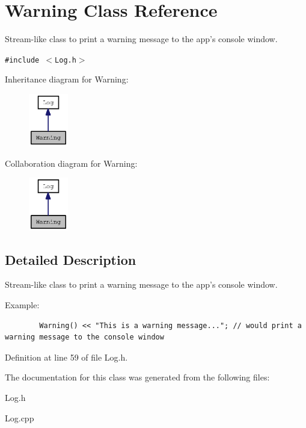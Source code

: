 \section{Warning Class Reference}
\label{classWarning}
Stream-like class to print a warning message to the app's console window.  


{\tt \#include $<$Log.h$>$}

Inheritance diagram for Warning:\nopagebreak
\begin{figure}[H]
\begin{center}
\leavevmode
\includegraphics[width=49pt]{classWarning__inherit__graph}
\end{center}
\end{figure}
Collaboration diagram for Warning:\nopagebreak
\begin{figure}[H]
\begin{center}
\leavevmode
\includegraphics[width=49pt]{classWarning__coll__graph}
\end{center}
\end{figure}


\subsection{Detailed Description}
Stream-like class to print a warning message to the app's console window. 

Example: 

\begin{Code}\begin{verbatim}        Warning() << "This is a warning message..."; // would print a warning message to the console window
\end{verbatim}
\end{Code}

 

Definition at line 59 of file Log.h.

The documentation for this class was generated from the following files:\begin{CompactItemize}
\item 
Log.h\item 
Log.cpp\end{CompactItemize}
